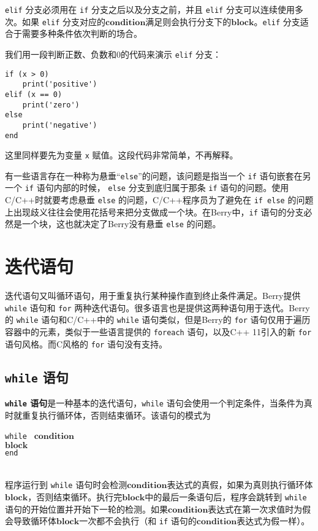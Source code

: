 \texttt{elif} 分支必须用在 \texttt{if} 分支之后以及分支之前，并且 \texttt{elif} 分支可以连续使用多次。如果 \texttt{elif} 分支对应的$\bm{condition}$满足则会执行分支下的$\bm{block}$。\texttt{elif} 分支适合于需要多种条件依次判断的场合。

我们用一段判断正数、负数和0的代码来演示 \texttt{elif} 分支：
\begin{lstlisting}[language=berry, numbers=none]
if (x > 0)
    print('positive')
elif (x == 0)
    print('zero')
else
    print('negative')
end
\end{lstlisting}
这里同样要先为变量 \texttt{x} 赋值。这段代码非常简单，不再解释。

有一些语言存在一种称为悬垂``\texttt{else}''的问题，该问题是指当一个 \texttt{if} 语句嵌套在另一个 \texttt{if} 语句内部的时候， \texttt{else} 分支到底归属于那条 \texttt{if} 语句的问题。使用C/C++时就要考虑悬垂 \texttt{else} 的问题，C/C++程序员为了避免在 \texttt{if else} 的问题上出现歧义往往会使用花括号来把分支做成一个块。在Berry中，\texttt{if} 语句的分支必然是一个块，这也就决定了Berry没有悬垂 \texttt{else} 的问题。

\section{迭代语句}

迭代语句又叫循环语句，用于重复执行某种操作直到终止条件满足。Berry提供 \texttt{while} 语句和 \texttt{for} 两种迭代语句。很多语言也是提供这两种语句用于迭代。Berry的 \texttt{while} 语句和C/C++中的 \texttt{while} 语句类似，但是Berry的 \texttt{for} 语句仅用于遍历容器中的元素，类似于一些语言提供的 \texttt{foreach} 语句，以及C++ 11引入的新 \texttt{for} 语句风格。而C风格的 \texttt{for} 语句没有支持。

\subsection{\texttt{while} 语句}

\textbf{\texttt{while} 语句}是一种基本的迭代语句，\texttt{while} 语句会使用一个判定条件，当条件为真时就重复执行循环体，否则结束循环。该语句的模式为
\begin{algorithm}
    \texttt{while } $\bm{condition}$ \\
        \qquad $\bm{block}$ \\
    \texttt{end}
\end{algorithm}\vspace{-0.6em}\\
程序运行到 \texttt{while} 语句时会检测$\bm{condition}$表达式的真假，如果为真则执行循环体$\bm{block}$，否则结束循环。执行完$\bm{block}$中的最后一条语句后，程序会跳转到 \texttt{while} 语句的开始位置并开始下一轮的检测。如果$\bm{condition}$表达式在第一次求值时为假会导致循环体$\bm{block}$一次都不会执行（和 \texttt{if} 语句的$\bm{condition}$表达式为假一样）。

